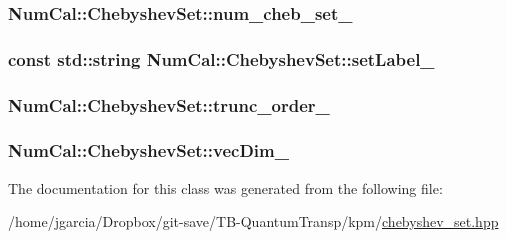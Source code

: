 \hypertarget{classNumCal_1_1ChebyshevSet_a7d36e4b9044a93b700490fdfdcf21c4d}{
\subsubsection[{num\+\_\+cheb\+\_\+set\+\_\+}]{ Num\+Cal\+::\+Chebyshev\+Set\+::num\+\_\+cheb\+\_\+set\+\_\+\hspace{0.3cm}{\ttfamily [private]}}}\label{classNumCal_1_1ChebyshevSet_a7d36e4b9044a93b700490fdfdcf21c4d}
\hypertarget{classNumCal_1_1ChebyshevSet_a1a42d6754802e8ceca50684cd13ac381}{
\subsubsection[{set\+Label\+\_\+}]{\setlength{\rightskip}{0pt plus 5cm}const std\+::string Num\+Cal\+::\+Chebyshev\+Set\+::set\+Label\+\_\+\hspace{0.3cm}{\ttfamily [private]}}}\label{classNumCal_1_1ChebyshevSet_a1a42d6754802e8ceca50684cd13ac381}
\hypertarget{classNumCal_1_1ChebyshevSet_a07ae814a2a669d366e064aa4b1f1b133}{
\subsubsection[{trunc\+\_\+order\+\_\+}]{ Num\+Cal\+::\+Chebyshev\+Set\+::trunc\+\_\+order\+\_\+\hspace{0.3cm}{\ttfamily [private]}}}\label{classNumCal_1_1ChebyshevSet_a07ae814a2a669d366e064aa4b1f1b133}
\hypertarget{classNumCal_1_1ChebyshevSet_a723ec8b3618b04a2cdb12eedf73199c9}{
\subsubsection[{vec\+Dim\+\_\+}]{ Num\+Cal\+::\+Chebyshev\+Set\+::vec\+Dim\+\_\+\hspace{0.3cm}{\ttfamily [private]}}}\label{classNumCal_1_1ChebyshevSet_a723ec8b3618b04a2cdb12eedf73199c9}


The documentation for this class was generated from the following file\+:\begin{DoxyCompactItemize}
\item 
/home/jgarcia/\+Dropbox/git-\/save/\+T\+B-\/\+Quantum\+Transp/kpm/\hyperlink{chebyshev__set_8hpp}{chebyshev\+\_\+set.\+hpp}\end{DoxyCompactItemize}
